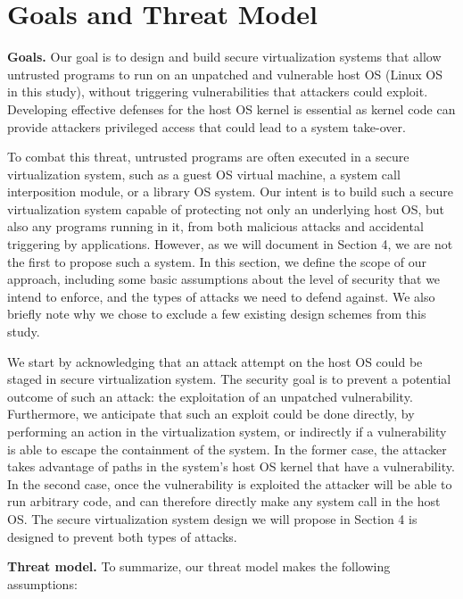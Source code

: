 \section{Goals and Threat Model}
\label{sec.motivation-and-background}

\textbf{Goals.}
Our goal is to design and build secure virtualization systems that allow
untrusted programs to run on an unpatched and vulnerable host OS (Linux OS in
this study), without triggering vulnerabilities that attackers could exploit.
Developing effective defenses for the host OS kernel is essential as kernel code
can provide attackers privileged access that could lead to a system take-over.

To combat this threat, untrusted programs are often executed in a secure
virtualization system, such as a guest OS virtual machine, a system call interposition
module, or a library OS system. Our intent is to
build such a secure virtualization system capable of protecting not only
an underlying host OS, but also any programs running in it, from both malicious attacks
and accidental triggering by applications. However, as we will document
in Section 4, we are not the first to propose such a system.
In this section, we define the scope of our approach, including some basic
assumptions about the level of security that we intend to enforce,
and the types of attacks we need to defend against. We also briefly note why we
chose to exclude a few existing design schemes from this study.

We start by acknowledging that an attack attempt on the host OS could be staged in
secure virtualization system. The security goal is to prevent a potential
outcome of such an attack: the exploitation of an unpatched vulnerability.
Furthermore, we anticipate that such an exploit could be done directly, by performing
 an action in the virtualization system, or indirectly if a vulnerability is
able to escape the containment of the system. In the former case, the attacker
takes advantage of paths in the system's host OS kernel
that have a vulnerability. In the second case, once the vulnerability is exploited
the attacker will be able to run arbitrary code, and can
therefore directly make any system call in the host OS.
The secure virtualization system design we will propose
in Section 4 is designed to prevent both types of attacks.

\noindent
\textbf{Threat model.}
To summarize, our threat model makes the following assumptions:

